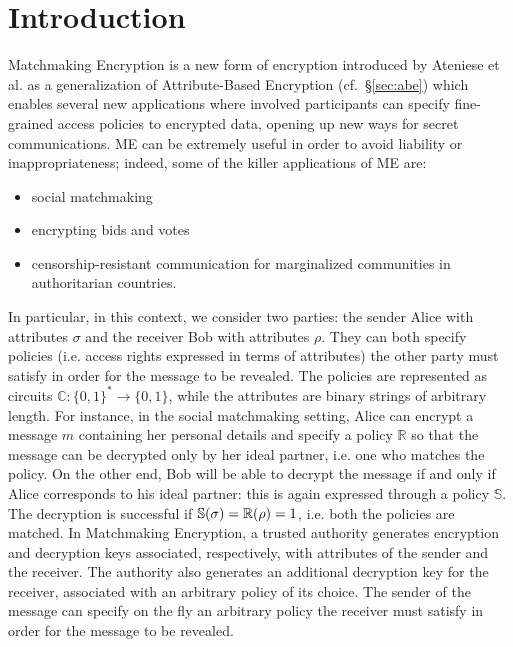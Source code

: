 \chapter{Introduction}
Matchmaking Encryption is a new form of encryption introduced by Ateniese et al. \cite{Ateniese} as a generalization of Attribute-Based Encryption (cf.\ \S\ref{sec:abe}) which enables several new applications where involved participants can specify fine-grained access policies to encrypted data, opening up new ways for secret communications.
\newline\newline
ME can be extremely useful in order to avoid liability or inappropriateness; indeed, some of the killer applications of ME are:
\begin{itemize}
    \item social matchmaking
    \item encrypting bids and votes
    \item censorship-resistant communication for marginalized communities in authoritarian countries.
\end{itemize}
In particular, in this context, we consider two parties: the sender Alice with attributes $\sigma$ and the receiver Bob with attributes $\rho$.
They can both specify policies (i.e. access rights expressed in terms of attributes) the other party must satisfy in order for the message to be revealed.
The policies are represented as circuits $\mathbb{C} : \{0, 1\}^* \to \{0, 1\}$, while the attributes are binary strings of arbitrary length.
For instance, in the social matchmaking setting, Alice can encrypt a message $m$ containing her personal details and specify a policy $\mathbb{R}$ so that the message can be decrypted only by her ideal partner, i.e. one who matches the policy.
On the other end, Bob will be able to decrypt the message if and only if Alice corresponds to his ideal partner: this is again expressed through a policy $\mathbb{S}$.
The decryption is successful if $\mathbb{S}(\sigma) = \mathbb{R}(\rho) = 1$, i.e. both the policies are matched.
\newline\newline
In Matchmaking Encryption, a trusted authority generates encryption and decryption keys associated, respectively, with attributes of the sender and the receiver.
The authority also generates an additional decryption key for the receiver, associated with an arbitrary policy of its choice.
The sender of the message can specify on the fly an arbitrary policy the receiver must satisfy in order for the message to be revealed.
